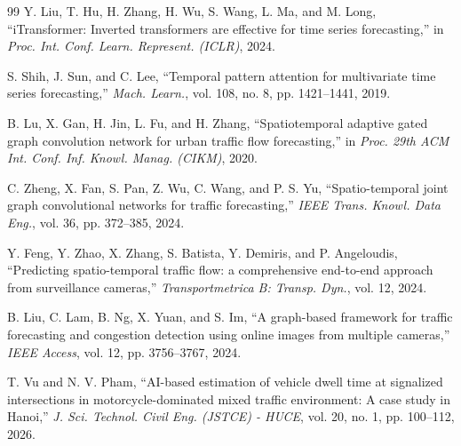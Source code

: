 \documentclass[journal,twocolumn]{IEEEtran}
\begin{document}
\begin{thebibliography}{99}
Y. Liu, T. Hu, H. Zhang, H. Wu, S. Wang, L. Ma, and M. Long, ``iTransformer: Inverted transformers are effective for time series forecasting,'' in \emph{Proc. Int. Conf. Learn. Represent. (ICLR)}, 2024.

S. Shih, J. Sun, and C. Lee, ``Temporal pattern attention for multivariate time series forecasting,'' \emph{Mach. Learn.}, vol. 108, no. 8, pp. 1421--1441, 2019.

B. Lu, X. Gan, H. Jin, L. Fu, and H. Zhang, ``Spatiotemporal adaptive gated graph convolution network for urban traffic flow forecasting,'' in \emph{Proc. 29th ACM Int. Conf. Inf. Knowl. Manag. (CIKM)}, 2020.

C. Zheng, X. Fan, S. Pan, Z. Wu, C. Wang, and P. S. Yu, ``Spatio-temporal joint graph convolutional networks for traffic forecasting,'' \emph{IEEE Trans. Knowl. Data Eng.}, vol. 36, pp. 372--385, 2024.

Y. Feng, Y. Zhao, X. Zhang, S. Batista, Y. Demiris, and P. Angeloudis, ``Predicting spatio-temporal traffic flow: a comprehensive end-to-end approach from surveillance cameras,'' \emph{Transportmetrica B: Transp. Dyn.}, vol. 12, 2024.

B. Liu, C. Lam, B. Ng, X. Yuan, and S. Im, ``A graph-based framework for traffic forecasting and congestion detection using online images from multiple cameras,'' \emph{IEEE Access}, vol. 12, pp. 3756--3767, 2024.

T. Vu and N. V. Pham, ``AI-based estimation of vehicle dwell time at signalized intersections in motorcycle-dominated mixed traffic environment: A case study in Hanoi,'' \emph{J. Sci. Technol. Civil Eng. (JSTCE) - HUCE}, vol. 20, no. 1, pp. 100--112, 2026.

\end{thebibliography}
\end{document}
